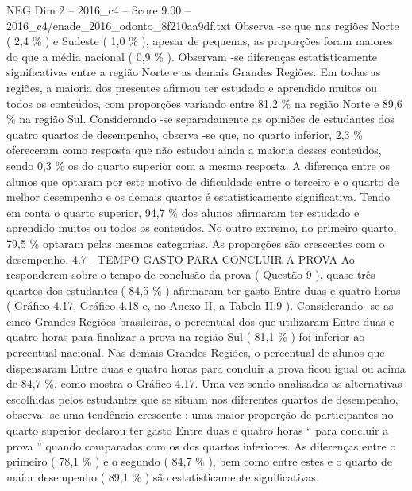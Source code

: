 \begin{textsample}{NEG Dim 2 – 2016\_c4 – Score 9.00 – 2016\_c4/enade\_2016\_odonto\_8f210aa9df.txt}
Observa -se que nas regiões Norte ( 2,4 \% ) e Sudeste ( 1,0 \% ), apesar de pequenas, as proporções foram maiores do que a média nacional ( 0,9 \% ).
Observam -se diferenças estatisticamente significativas entre a região Norte e as demais Grandes Regiões.
Em todas as regiões, a maioria dos presentes afirmou ter estudado e aprendido muitos ou todos os conteúdos, com proporções variando entre 81,2 \% na região Norte e 89,6 \% na região Sul.
Considerando -se separadamente as opiniões de estudantes dos quatro quartos de desempenho, observa -se que, no quarto inferior, 2,3 \% ofereceram como resposta que não estudou ainda a maioria desses conteúdos, sendo 0,3 \% os do quarto superior com a mesma resposta.
A diferença entre os alunos que optaram por este motivo de dificuldade entre o terceiro e o quarto de melhor desempenho e os demais quartos é estatisticamente significativa.
Tendo em conta o quarto superior, 94,7 \% dos alunos afirmaram ter estudado e aprendido muitos ou todos os conteúdos.
No outro extremo, no primeiro quarto, 79,5 \% optaram pelas mesmas categorias.
As proporções são crescentes com o desempenho. 4.7 - TEMPO GASTO PARA CONCLUIR A PROVA Ao responderem sobre o tempo de conclusão da prova ( Questão 9 ), quase três quartos dos estudantes ( 84,5 \% ) afirmaram ter gasto Entre duas e quatro horas ( Gráfico 4.17, Gráfico 4.18 e, no Anexo II, a Tabela II.9 ).
Considerando -se as cinco Grandes Regiões brasileiras, o percentual dos que utilizaram Entre duas e quatro horas para finalizar a prova na região Sul ( 81,1 \% ) foi inferior ao percentual nacional.
Nas demais Grandes Regiões, o percentual de alunos que dispensaram Entre duas e quatro horas para concluir a prova ficou igual ou acima de 84,7 \%, como mostra o Gráfico 4.17.
Uma vez sendo analisadas as alternativas escolhidas pelos estudantes que se situam nos diferentes quartos de desempenho, observa -se uma tendência crescente : uma maior proporção de participantes no quarto superior declarou ter gasto Entre duas e quatro horas “ para concluir a prova ” quando comparadas com os dos quartos inferiores.
As diferenças entre o primeiro ( 78,1 \% ) e o segundo ( 84,7 \% ), bem como entre estes e o quarto de maior desempenho ( 89,1 \% ) são estatisticamente significativas.

\end{textsample}
